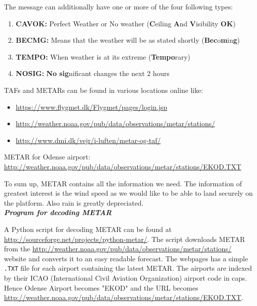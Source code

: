 The message can additionally have one or more of the four following types:
\begin{enumerate}
	\item \textbf{CAVOK:} Perfect Weather or No weather (\textbf{C}eiling \textbf{A}nd \textbf{V}isibility \textbf{OK})
	\item \textbf{BECMG:} Means that the weather will be as stated shortly (\textbf{Bec}o\textbf{m}in\textbf{g})
	\item \textbf{TEMPO:} When weather is at its extreme (\textbf{Tempo}rary)
	\item \textbf{NOSIG:} \textbf{No sig}nificant changes the next 2 hours
\end{enumerate}

TAFs and METARs can be found in various locations online like:
\begin{itemize}
	\item \url{https://www.flygmet.dk/Flygmet/pages/login.jsp}
	\item \url{http://weather.noaa.gov/pub/data/observations/metar/stations/}
	\item \url{http://www.dmi.dk/vejr/i-luften/metar-og-taf/}
\end{itemize}

METAR for Odense airport:
\url{http://weather.noaa.gov/pub/data/observations/metar/stations/EKOD.TXT}

To sum up, METAR contains all the information we need. The information of greatest interest is the wind speed as we would like to be able to land securely on the platform. Also rain is greatly depreciated.\\
\emph{\textbf{Program for decoding METAR}}

A Python script for decoding METAR can be found at \url{http://sourceforge.net/projects/python-metar/}. The script downloads METAR from the \url{http://weather.noaa.gov/pub/data/observations/metar/stations/} website and converts it to an easy readable forecast. The webpages has a simple \verb|.TXT| file for each airport containing the latest METAR. The airports are indexed by their ICAO (International Civil Aviation Organization) airport code in caps. Hence Odense Airport becomes "EKOD" and the URL becomes \url{http://weather.noaa.gov/pub/data/observations/metar/stations/EKOD.TXT}.

